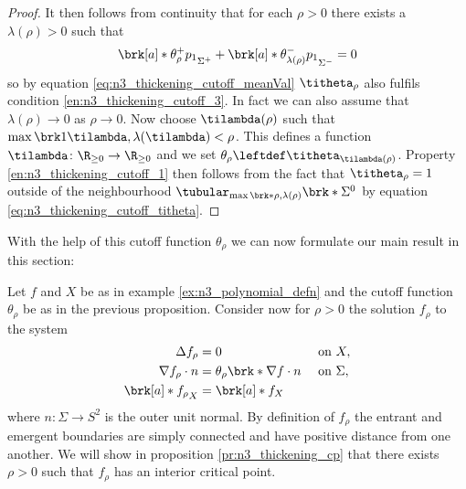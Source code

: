 \begin{proof}
  It then follows from continuity that for each $\rho>0$ there exists a $\lambda(\rho)>0$ such that
  \begin{align*}
    \brk[a]*{\theta_\rho^+p_1}_{\Sigma^+}+\brk[a]*{\theta_{\lambda(\rho)}^-p_1}_{\Sigma^-}=0
  \end{align*}
  so by equation \eqref{eq:n3_thickening_cutoff_meanVal} $\titheta_\rho$ also fulfils condition \ref{en:n3_thickening_cutoff_3}.
  In fact we can also assume that $\lambda(\rho)\to0$ as $\rho\to0$.
  Now choose $\tilambda(\rho)$ such that $\max\brk1{\tilambda,\lambda(\tilambda)}<\rho$.
  This defines a function $\tilambda\colon \R_{\geq0}\to\R_{\geq0}$ and we set
  $\theta_\rho\leftdef \titheta_{\tilambda(\rho)}$. 
  Property \ref{en:n3_thickening_cutoff_1} then follows from the fact that $\titheta_\rho=1$ outside of the neighbourhood $\tubular_{\max\brk*{\rho,\lambda(\rho)}}\brk*{\Sigma^0}$ by
  equation \ref{eq:n3_thickening_cutoff_titheta}.
\end{proof}
With the help of this cutoff function $\theta_\rho$ we can now formulate our main result in this section:
\begin{example}
  \label{ex:n3_thickening}
  Let $f$ and $X$ be as in example \ref{ex:n3_polynomial_defn} and the cutoff function $\theta_\rho$ be as in
  the previous proposition.
  Consider now for $\rho>0$ the solution $f_\rho$ to the system
  \begin{align*}
    \Delta f_\rho&=0 &&\text{ on }X, \\
    \nabla f_\rho\cdot n&=\theta_\rho\brk*{\nabla f\cdot n} &&\text{ on }\Sigma, \\
    \brk[a]*{f_\rho}_X&=\brk[a]*{f}_X &&
  \end{align*}
  where $n\colon\Sigma\to S^2$ is the outer unit normal.
  By definition of $f_\rho$ the entrant and emergent boundaries are simply connected
  and have positive distance from one another.
  We will show in proposition \ref{pr:n3_thickening_cp} that there exists $\rho>0$ such that $f_\rho$ has an interior
  critical point.
\end{example}

